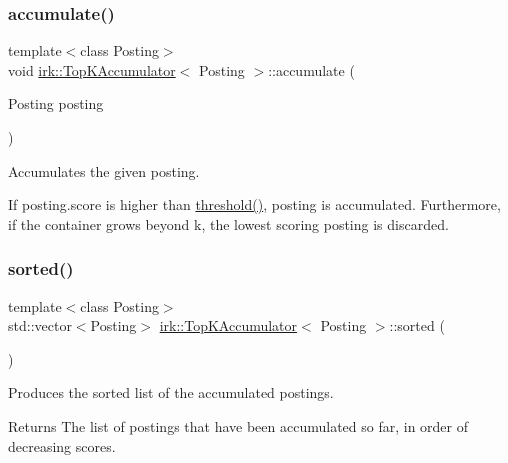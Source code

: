 \subsubsection{\texorpdfstring{accumulate()}{accumulate()}}
{\footnotesize\ttfamily template$<$class Posting$>$ \\
void \mbox{\hyperlink{classirk_1_1TopKAccumulator}{irk\+::\+Top\+K\+Accumulator}}$<$ Posting $>$\+::accumulate (\begin{DoxyParamCaption}\item[{Posting}]{posting }\end{DoxyParamCaption})\hspace{0.3cm}{\ttfamily [inline]}}



Accumulates the given posting. 

If {\ttfamily posting.\+score} is higher than \mbox{\hyperlink{classirk_1_1TopKAccumulator_a0b557d7814259c5fcb2cf6528c13f45a}{threshold()}}, {\ttfamily posting} is accumulated. Furthermore, if the container grows beyond {\ttfamily k}, the lowest scoring posting is discarded. \mbox{\label{classirk_1_1TopKAccumulator_a1bfdc5fdd3d6957ac7dd7eddb7e160fe}} 
\subsubsection{\texorpdfstring{sorted()}{sorted()}}
{\footnotesize\ttfamily template$<$class Posting$>$ \\
std\+::vector$<$Posting$>$ \mbox{\hyperlink{classirk_1_1TopKAccumulator}{irk\+::\+Top\+K\+Accumulator}}$<$ Posting $>$\+::sorted (\begin{DoxyParamCaption}{ }\end{DoxyParamCaption})\hspace{0.3cm}{\ttfamily [inline]}}



Produces the sorted list of the accumulated postings. 

\begin{DoxyReturn}{Returns}
The list of postings that have been accumulated so far, in order of decreasing scores. 
\end{DoxyReturn}
\mbox{\label{classirk_1_1TopKAccumulator_a0b557d7814259c5fcb2cf6528c13f45a}} 
